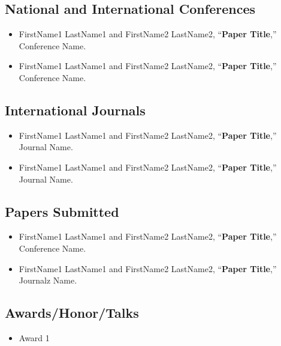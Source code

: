 \begin{spacing}{1.6}


\subsection*{National and International Conferences}
\begin{itemize}
\item FirstName1 LastName1 and FirstName2 LastName2, \textquotedblleft{}\textbf{Paper Title},''
Conference Name.
\item FirstName1 LastName1 and FirstName2 LastName2, \textquotedblleft{}\textbf{Paper Title},''
Conference Name.
\end{itemize}

\subsection*{International Journals}
\begin{itemize}
\item FirstName1 LastName1 and FirstName2 LastName2, \textquotedblleft{}\textbf{Paper Title},''
Journal Name.
\item FirstName1 LastName1 and FirstName2 LastName2, \textquotedblleft{}\textbf{Paper Title},''
Journal Name.
\end{itemize}

\subsection*{Papers Submitted}
\begin{itemize}
\item FirstName1 LastName1 and FirstName2 LastName2, \textquotedblleft{}\textbf{Paper Title},''
Conference Name.
\item FirstName1 LastName1 and FirstName2 LastName2, \textquotedblleft{}\textbf{Paper Title},''
Journalz Name.
\end{itemize}


\subsection*{Awards/Honor/Talks}
\begin{itemize}
\item Award 1
\end{itemize}
\bigskip{}


\noindent

\end{spacing} 